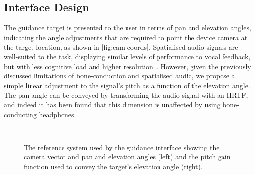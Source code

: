 \documentclass{llncs}
\begin{document}
\subsection{Interface Design}

The guidance target is presented to the user in terms of pan and elevation angles, indicating the angle adjustments that are required to point the device camera at the target location, as shown in \cref{fig:cam-coords}.
Spatialised audio signals are well-suited to the task, displaying similar levels of performance to vocal feedback, but with less cognitive load and higher resolution~\cite{klatzky2006cognitive}.
However, given the previously discussed limitations of bone-conduction and spatialised audio, we propose a simple linear adjustment to the signal's pitch as a function of the elevation angle. 
The pan angle can be conveyed by transforming the audio signal with an HRTF, and indeed it has been found that this dimension is unaffected by using bone-conducting headphones\cite{schonstein2008comparison,macdonald2006spatial,stanley2006lateralization}. 

\begin{figure}
  \centering
~
  \caption{The reference system used by the guidance interface showing the camera vector and pan and elevation angles (left) and the pitch gain function used to convey the target's elevation angle (right). }
\end{figure}
\end{document}
